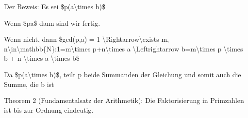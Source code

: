 \documentclass[a4paper]{article}
\begin{document}
\begin{multicols}{3}
\begin{itemize*}
            \begin{itemize*}
                  \item Der Beweis: Es sei \$p\textbar(a\textbackslash times b)\$
                  \begin{itemize*} \item Wenn \$p\textbar a\$ dann sind wir fertig. \item Wenn nicht, dann \$gcd(p,a) = 1 \textbackslash Rightarrow\textbackslash exists m, n\textbackslash in\textbackslash mathbb\{N\}:1=m\textbackslash times p+n\textbackslash times a \textbackslash Leftrightarrow b=m\textbackslash times p \textbackslash times b + n \textbackslash times a \textbackslash times b\$ \item Da \$p\textbar(a\textbackslash times b)\$, teilt p beide Summanden der Gleichung und somit auch die Summe, die b ist \end{itemize*}
            \end{itemize*}
            \item
            Theorem 2 (Fundamentalsatz der Arithmetik): Die Faktorisierung in
            Primzahlen ist bis zur Ordnung eindeutig.


\end{itemize*}
\end{multicols}
\end{document}

